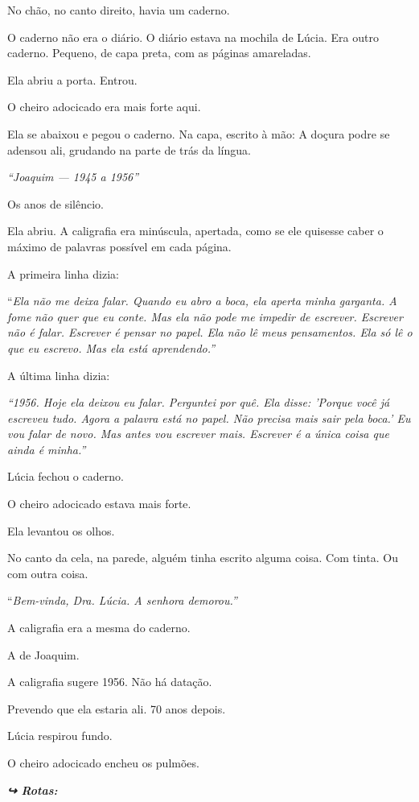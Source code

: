 \noindent No chão, no canto direito, havia um caderno.

\noindent O caderno não era o diário. O diário estava na mochila de Lúcia. Era outro caderno. Pequeno, de capa preta, com as páginas amareladas.

\noindent Ela abriu a porta. Entrou.

\noindent O cheiro adocicado era mais forte aqui.

\noindent Ela se abaixou e pegou o caderno. Na capa, escrito à mão:
\noindent A doçura podre se adensou ali, grudando na parte de trás da língua.

\noindent \textit{\textquotedblleft{}Joaquim --- 1945 a 1956\textquotedblright{}}

\noindent Os anos de silêncio.

\noindent Ela abriu. A caligrafia era minúscula, apertada, como se ele quisesse caber o máximo de palavras possível em cada página.

\noindent A primeira linha dizia:

\noindent \textquotedblleft{\textit{Ela não me deixa falar. Quando eu abro a boca, ela aperta minha garganta. A fome não quer que eu conte. Mas ela não pode me impedir de escrever. Escrever não é falar. Escrever é pensar no papel. Ela não lê meus pensamentos. Ela só lê o que eu escrevo. Mas ela está aprendendo.\textquotedblright{}}}

\noindent A última linha dizia:

\noindent \textit{\textquotedblleft{}1956. Hoje ela deixou eu falar. Perguntei por quê. Ela disse: 'Porque você já escreveu tudo. Agora a palavra está no papel. Não precisa mais sair pela boca.' Eu vou falar de novo. Mas antes vou escrever mais. Escrever é a única coisa que ainda é minha.\textquotedblright{}}

\noindent Lúcia fechou o caderno.

\noindent O cheiro adocicado estava mais forte.

\noindent Ela levantou os olhos.

\noindent No canto da cela, na parede, alguém tinha escrito alguma coisa. Com tinta. Ou com outra coisa.

\noindent \textquotedblleft{\textit{Bem-vinda, Dra. Lúcia. A senhora demorou.\textquotedblright{}}}

\noindent A caligrafia era a mesma do caderno.

\noindent A de Joaquim.

\noindent A caligrafia sugere 1956. Não há datação.

\noindent Prevendo que ela estaria ali. 70 anos depois.

\noindent Lúcia respirou fundo.

\noindent O cheiro adocicado encheu os pulmões.

\vspace{0.5em}
\noindent\textit{\textbf{↪ Rotas:}  \rotasep {}}